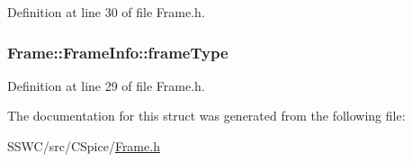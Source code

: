 Definition at line 30 of file Frame.\+h.

\hypertarget{struct_frame_1_1_frame_info_a26a5b5ce9d01a6029fbd2aaf6c77e574}{
\subsubsection[{frame\+Type}]{ Frame\+::\+Frame\+Info\+::frame\+Type}}\label{struct_frame_1_1_frame_info_a26a5b5ce9d01a6029fbd2aaf6c77e574}


Definition at line 29 of file Frame.\+h.



The documentation for this struct was generated from the following file\+:\begin{DoxyCompactItemize}
\item 
S\+S\+W\+C/src/\+C\+Spice/\hyperlink{_frame_8h}{Frame.\+h}\end{DoxyCompactItemize}
